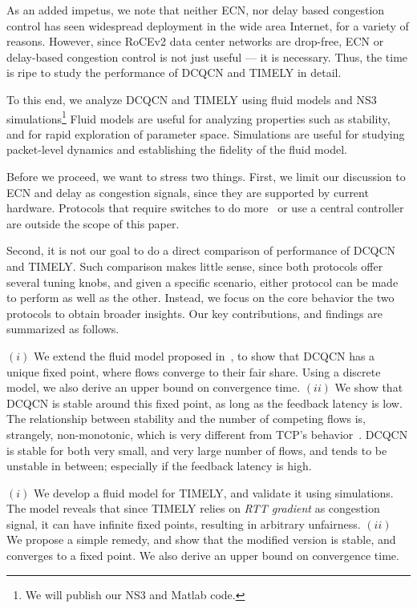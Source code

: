 As an added impetus, we note that neither ECN, nor delay based congestion
control has seen widespread deployment in the wide area Internet, for a variety
of reasons.  However, since RoCEv2 data center networks are drop-free, ECN or
delay-based congestion control is not just useful --- it is necessary. Thus, the
time is ripe to study the performance of DCQCN and TIMELY in detail.


To this end, we analyze DCQCN and TIMELY using fluid models and NS3~\cite{NS3}
simulations\footnote{We will publish our NS3 and Matlab code.} Fluid models are
useful for analyzing properties such as stability, and for rapid exploration of
parameter space.  Simulations are useful for studying packet-level dynamics and
establishing the fidelity of the fluid model. 


Before we proceed, we want to stress two things.  First, we limit our discussion
to ECN and delay as congestion signals, since they are supported by current
hardware. Protocols that require switches to do
more~\cite{katabi2002congestion,rcp,pfabric} or use a central
controller~\cite{deadline,perry2014fastpass} are outside the scope of this
paper.

Second, it is not our goal to do a direct comparison of performance of DCQCN and
TIMELY.  Such comparison makes little sense, since both protocols offer several
tuning knobs, and given a specific scenario, either protocol can be made to
perform as well as the other. Instead, we focus on the core behavior the two
protocols to obtain broader insights.  Our key contributions, and findings are
summarized as follows.

 $(i)$ We extend the fluid model proposed in~\cite{dcqcn}, to show
that DCQCN has a unique fixed point, where flows converge to their fair share.
Using a discrete model, we also derive an upper  bound on convergence time.
$(ii)$ We show that DCQCN is stable around this fixed point, as long as the
feedback latency is low. The relationship between stability and the number of
competing flows is, strangely, non-monotonic, which is very different from TCP's
behavior~\cite{misra:TAC2002}. DCQCN is stable for both very small, and very
large number of flows, and tends to be unstable in between; especially if the
feedback latency is high.

 $(i)$ We develop a fluid model for TIMELY, and validate it using
simulations. The model reveals that since TIMELY relies on {\em RTT
gradient} as congestion signal, it can have infinite fixed points, resulting in
arbitrary unfairness.  $(ii)$ We propose a simple remedy,
and show that the modified version is stable, and converges to a fixed point. We
also derive an upper bound on convergence time.

